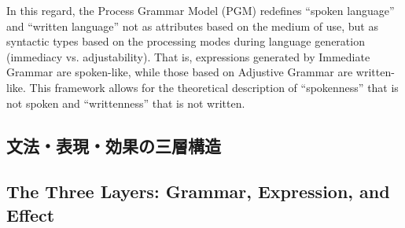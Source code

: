 In this regard, the Process Grammar Model (PGM) redefines ``spoken language'' and ``written language'' not as attributes based on the medium of use, but as syntactic types based on the processing modes during language generation (immediacy vs. adjustability). That is, expressions generated by Immediate Grammar are spoken-like, while those based on Adjustive Grammar are written-like. This framework allows for the theoretical description of ``spokenness'' that is not spoken and ``writtenness'' that is not written.
\fi

\ifJPN
\subsection{文法・表現・効果の三層構造}
\else
\subsection{The Three Layers: Grammar, Expression, and Effect}
\fi


